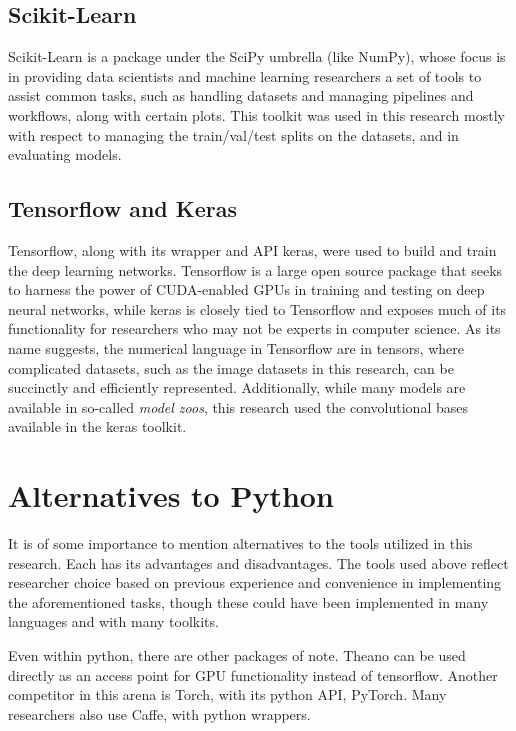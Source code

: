 \subsection{Scikit-Learn}
\label{ssec:appendix-a-scikitlearn}

Scikit-Learn is a package under the SciPy umbrella (like NumPy), whose focus is in providing data scientists and machine learning researchers a set of tools to assist common tasks, such as handling datasets and managing pipelines and workflows, along with certain plots.
This toolkit was used in this research mostly with respect to managing the train/val/test splits on the datasets, and in evaluating models.

\subsection{Tensorflow and Keras}
\label{ssec:appendix-a-tf}

Tensorflow, along with its wrapper and API keras, were used to build and train the deep learning networks.
Tensorflow is a large open source package that seeks to harness the power of CUDA-enabled GPUs in training and testing on deep neural networks, while keras is closely tied to Tensorflow and exposes much of its functionality for researchers who may not be experts in computer science.
As its name suggests, the numerical language in Tensorflow are in tensors, where complicated datasets, such as the image datasets in this research, can be succinctly and efficiently represented.
Additionally, while many models are available in so-called \textit{model zoos}, this research used the convolutional bases available in the keras toolkit.
 
\section{Alternatives to Python}
\label{ssec:appendix-a-alternatives}

It is of some importance to mention alternatives to the tools utilized in this research.
Each has its advantages and disadvantages.
The tools used above reflect researcher choice based on previous experience and convenience in implementing the aforementioned tasks, though these could have been implemented in many languages and with many toolkits.

Even within python, there are other packages of note.
Theano can be used directly as an access point for GPU functionality instead of tensorflow.
Another competitor in this arena is Torch, with its python API, PyTorch.
Many researchers also use Caffe, with python wrappers.

